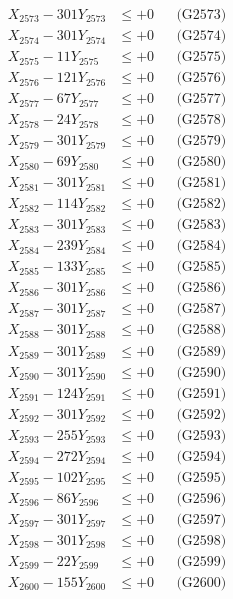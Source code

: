 \documentclass[a4paper,10pt]{article}
\begin{document}
{\begin{align}
X_{2573} - 301Y_{2573} &\leq +0 && \text{(G2573)} \\
X_{2574} - 301Y_{2574} &\leq +0 && \text{(G2574)} \\
X_{2575} - 11Y_{2575} &\leq +0 && \text{(G2575)} \\
X_{2576} - 121Y_{2576} &\leq +0 && \text{(G2576)} \\
X_{2577} - 67Y_{2577} &\leq +0 && \text{(G2577)} \\
X_{2578} - 24Y_{2578} &\leq +0 && \text{(G2578)} \\
X_{2579} - 301Y_{2579} &\leq +0 && \text{(G2579)} \\
X_{2580} - 69Y_{2580} &\leq +0 && \text{(G2580)} \\
\allowbreak
X_{2581} - 301Y_{2581} &\leq +0 && \text{(G2581)} \\
X_{2582} - 114Y_{2582} &\leq +0 && \text{(G2582)} \\
X_{2583} - 301Y_{2583} &\leq +0 && \text{(G2583)} \\
X_{2584} - 239Y_{2584} &\leq +0 && \text{(G2584)} \\
X_{2585} - 133Y_{2585} &\leq +0 && \text{(G2585)} \\
X_{2586} - 301Y_{2586} &\leq +0 && \text{(G2586)} \\
X_{2587} - 301Y_{2587} &\leq +0 && \text{(G2587)} \\
X_{2588} - 301Y_{2588} &\leq +0 && \text{(G2588)} \\
X_{2589} - 301Y_{2589} &\leq +0 && \text{(G2589)} \\
X_{2590} - 301Y_{2590} &\leq +0 && \text{(G2590)} \\
\allowbreak
X_{2591} - 124Y_{2591} &\leq +0 && \text{(G2591)} \\
X_{2592} - 301Y_{2592} &\leq +0 && \text{(G2592)} \\
X_{2593} - 255Y_{2593} &\leq +0 && \text{(G2593)} \\
X_{2594} - 272Y_{2594} &\leq +0 && \text{(G2594)} \\
X_{2595} - 102Y_{2595} &\leq +0 && \text{(G2595)} \\
X_{2596} - 86Y_{2596} &\leq +0 && \text{(G2596)} \\
X_{2597} - 301Y_{2597} &\leq +0 && \text{(G2597)} \\
X_{2598} - 301Y_{2598} &\leq +0 && \text{(G2598)} \\
X_{2599} - 22Y_{2599} &\leq +0 && \text{(G2599)} \\
X_{2600} - 155Y_{2600} &\leq +0 && \text{(G2600)} \\

\end{align}}
\end{document}

